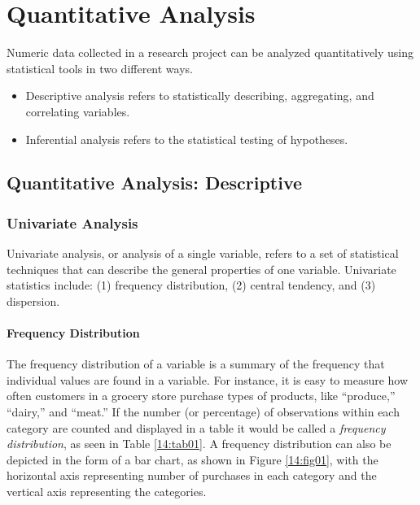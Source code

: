 \section{Quantitative Analysis}

Numeric data collected in a research project can be analyzed quantitatively using statistical tools in two different ways. 

\begin{itemize}

	\item Descriptive analysis refers to statistically describing, aggregating, and correlating variables. 

	\item Inferential analysis refers to the statistical testing of hypotheses. 

\end{itemize}

\subsection{Quantitative Analysis: Descriptive}

\subsubsection{Univariate Analysis}

Univariate analysis, or analysis of a single variable, refers to a set of statistical techniques that can describe the general properties of one variable. Univariate statistics include: (1) frequency distribution, (2) central tendency, and (3) dispersion. 

\paragraph{Frequency Distribution} The frequency distribution of a variable is a summary of the frequency that individual values are found in a variable. For instance, it is easy to measure how often customers in a grocery store purchase types of products, like ``produce,'' ``dairy,'' and ``meat.'' If the number (or percentage) of observations within each category are counted and displayed in a table it would be called a \textit{frequency distribution}, as seen in Table \ref{14:tab01}. A frequency distribution can also be depicted in the form of a bar chart, as shown in Figure \ref{14:fig01}, with the horizontal axis representing number of purchases in each category and the vertical axis representing the categories.

